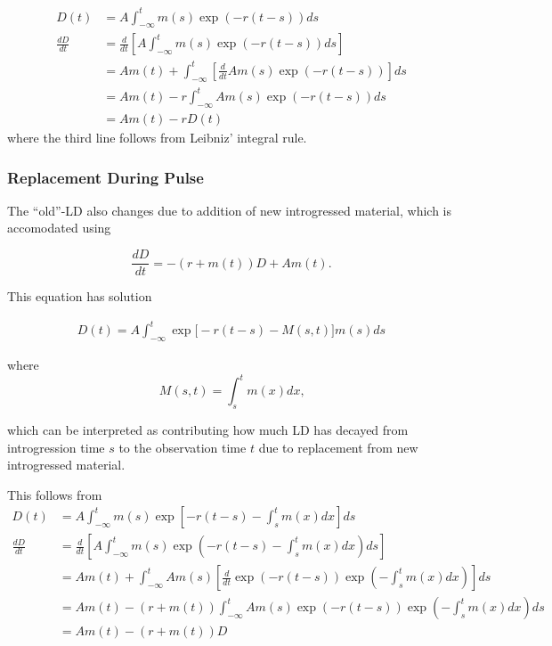 \documentclass[11pt]{article}
\begin{document}
\begin{align}
   D(t) &= A\int_{-\infty}^t m(s)\exp(-r(t-s)) ds \nonumber \\
   \frac{d D}{dt} &= \frac{d}{dt}\left[ A\int_{-\infty}^t m(s)\exp(-r(t-s)) ds \right]\nonumber\\
   &= A m(t) + \int_{-\infty}^t \left[\frac{d}{dt}A m(s)\exp(-r(t-s))\right]ds \nonumber\\
   &= A m(t) - r \int_{-\infty}^t A m(s)\exp(-r(t-s))ds \nonumber\\
   &= A m(t) -r D(t) 
  \end{align}
where the third line follows from Leibniz' integral rule.


\subsubsection{Replacement During Pulse}\label{Appendix_2}

The ``old''-LD also changes due to addition of new introgressed material, which is accomodated using

\begin{equation}
    \frac{dD}{dt} = -(r + m(t)) D + A m(t)\text{.}
\end{equation}

This equation has solution

\begin{align}
    D(t) = A\int_{-\infty}^t \exp\big[-r(t -s) - M(s,t)\big] m(s) ds
\end{align}

where $$M(s,t) = \int_s^t m(x)dx \text{,}$$

which can be interpreted as contributing how much LD has decayed from introgression time $s$ to the observation time $t$ due to replacement from new introgressed material.

This follows from 
\begin{align}
   D(t) &= A\int_{-\infty}^t m(s)\exp\left[-r(t-s) - \int_{s}^tm(x)dx\right] ds \nonumber \\
   \frac{d D}{dt} &= \frac{d}{dt}\left[ A\int_{-\infty}^t m(s)\exp\left(-r(t-s)-\int_{s}^tm(x)dx\right) ds \right]\nonumber\\
   &= A m(t) + \int_{-\infty}^t A m(s)\left[\frac{d}{dt}\exp\left(-r(t-s)\right)\exp\left(-\int_{s}^tm(x)dx\right)\right]ds \nonumber\\
&= A m(t) - (r + m(t)) \int_{-\infty}^t A m(s)\exp\left(-r(t-s)\right)\exp\left(-\int_{s}^tm(x)dx\right)ds \nonumber\\   
&=A m(t) - (r + m(t)) D
  \end{align}
  
\end{document}
